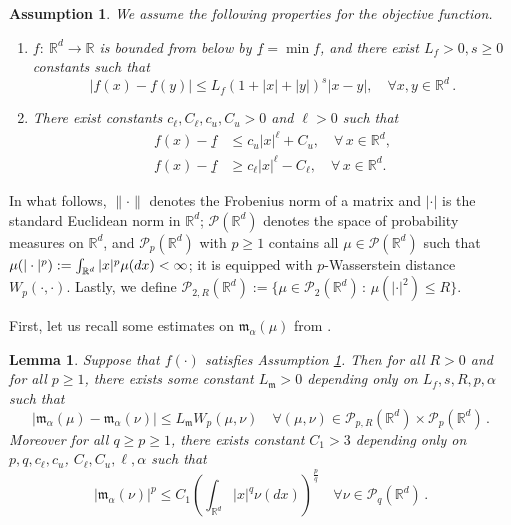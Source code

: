 \documentclass[12pt]{amsart}
\newcommand{\dx}{{\rm d} x}
\newcommand{\RR}{{\mathbb R}}
\numberwithin{equation}{section}
\newtheorem{lemma}[theorem]{Lemma}
\newtheorem{assum}[theorem]{Assumption}
\begin{document}
\begin{assum}\label{assum1}
	We assume the following properties for the objective function.%
	\begin{enumerate}
		\item $f:~\RR^d\to \RR$ is bounded from below by $\underline f=\min f$, and there exist $L_{f}>0, s\geq 0$ constants such that
		\begin{equation*}
			|f(x)-f(y)|\leq L_f(1+|x|+|y|)^s|x-y|, \quad \forall x,y\in \RR^d\,.
		\end{equation*} 
		\item There exist constants $c_\ell,C_\ell, c_u, C_u>0$  and $\ell>0$ such that
        \begin{equation*}
        \begin{aligned}
			f(x) -\underline f & \leq c_u|x|^\ell+C_u,\quad \forall\, x\in \RR^d,\\
            f(x) -\underline f	& \geq c_\ell |x|^\ell-C_\ell,\quad \forall\, x\in \RR^d.
        \end{aligned}
		\end{equation*}
	\end{enumerate}
\end{assum}


In what follows, $\|\cdot\|$ denotes the Frobenius norm of a matrix and $|\cdot|$ is the standard Euclidean norm in $\RR^d$; $\mathscr{P}(\RR^d)$ denotes the space of probability measures on $\RR^d$, and $\mathscr{P}_p(\RR^d)$ with $p\geq 1$ contains all $\mu\in \mathscr{P}(\RR^d)$ such that $\mu(|\cdot|^p):=\int_{\RR^d}|x|^p\mu(\dx)<\infty$; it is equipped with $p$-Wasserstein distance $W_p(\cdot,\cdot)$. 
Lastly, we define $\mathscr{P}_{2,R}(\mathbb{R}^{d}) := \{\mu \in \mathscr{P}_{2}(\mathbb{R}^{d})\,:\, \mu(|\cdot|^{2})\leq R\}$.



First, let us recall some estimates on $\mathfrak{m}_{\alpha}(\mu)$ from \cite[Corollary 3.3, Proposition A.3]{gerber2023mean}.
\begin{lemma}\label{lem: useful estimates}
Suppose that $f(\cdot)$ satisfies Assumption \ref{assum1}. Then for all $R>0$ and for all $p\geq 1$, 
there exists some constant $L_{\mathfrak{m}}>0$ depending only on $L_f,s,R,p,\alpha$ such that
\begin{equation}\label{lemeq1}
    |\mathfrak{m}_{\alpha}(\mu)-\mathfrak{m}_{\alpha}(\nu)|\leq L_{\mathfrak{m}} W_p(\mu,\nu)\quad \forall (\mu,\nu)\in \mathscr{P}_{p,R}(\RR^d)\times \mathscr{P}_{p}(\RR^d)\,.
\end{equation}
Moreover for all $q\geq p\geq 1$, there exists constant $C_1>3$ depending only on $p,q,c_\ell,c_u$, $C_\ell,C_u,\ell,\alpha$ such  that
\begin{equation}\label{lemeq2}
    |\mathfrak{m}_{\alpha}(\nu)|^p\leq C_1\left(\int_{\RR^d}|x|^q\nu(dx)\right)^{\frac{p}{q}}\quad \forall \nu\in \mathscr{P}_q(\RR^d)\,.
\end{equation}
\end{lemma}
\end{document}
